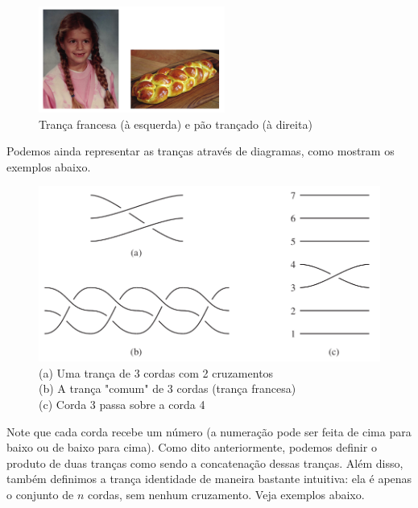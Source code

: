 	\begin{figure}[H]
		\begin{center}
			\includegraphics[width=6.1cm]{Images/exemplos_trancas.png}
		\end{center}
		\caption{Trança francesa (à esquerda) e pão trançado (à direita)}\label{exemplos de trancas}
	\end{figure}
	\par\vspace{0.3cm} Podemos ainda representar as tranças através de diagramas, como mostram os exemplos abaixo.
	
	\begin{figure}[H]
		\captionsetup{justification=centering}
		\begin{center}
			\includegraphics[width=12cm]{Images/exemplos_diagrama.png}
			\caption{
				(a) Uma trança de 3 cordas com 2 cruzamentos \\
				(b) A trança "comum" de 3 cordas (trança francesa) \\
				(c) Corda 3 passa sobre a corda 4
			}\label{diagramas de trancas}\end{center}
	\end{figure}
	
	\par\vspace{0.3cm} Note que cada corda recebe um número (a numeração pode ser feita de cima para baixo ou de baixo para cima). Como dito anteriormente, podemos definir o produto de duas tranças como sendo a concatenação dessas tranças. Além disso, também definimos a trança identidade de maneira bastante intuitiva: ela é apenas o conjunto de $n$ cordas, sem nenhum cruzamento. Veja exemplos abaixo.
	
